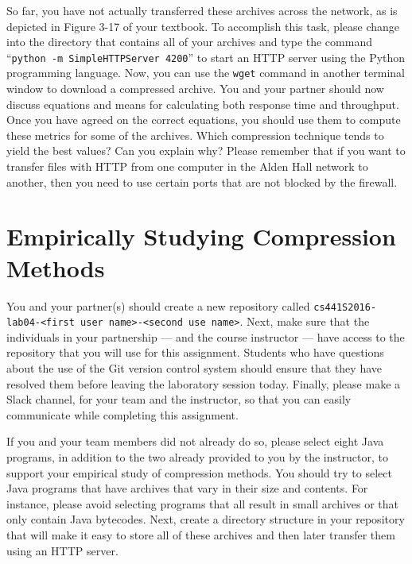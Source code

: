 So far, you have not actually transferred these archives across the network, as is depicted in Figure 3-17 of your
textbook. To accomplish this task, please change into the directory that contains all of your archives and type the
command ``{\tt python -m SimpleHTTPServer 4200}'' to start an HTTP server using the Python programming language. Now,
you can use the {\tt wget} command in another terminal window to download a compressed archive. You and your partner
should now discuss equations and means for calculating both response time and throughput. Once you have agreed on the
correct equations, you should use them to compute these metrics for some of the archives. Which compression technique
tends to yield the best values? Can you explain why? Please remember that if you want to transfer files with HTTP from
one computer in the Alden Hall network to another, then you need to use certain ports that are not blocked by the
firewall.

\section*{Empirically Studying Compression Methods}

You and your partner(s) should create a new repository called {\tt cs441S2016-lab04-<first user name>-<second use
name>}.  Next, make sure that the individuals in your partnership --- and the course instructor --- have access to the
repository that you will use for this assignment.  Students who have questions about the use of the Git version control
system should ensure that they have resolved them before leaving the laboratory session today. Finally, please make a
Slack channel, for your team and the instructor, so that you can easily communicate while completing this assignment.

If you and your team members did not already do so, please select eight Java programs, in addition to the two already
provided to you by the instructor, to support your empirical study of compression methods. You should try to select
Java programs that have archives that vary in their size and contents. For instance, please avoid selecting programs
that all result in small archives or that only contain Java bytecodes. Next, create a directory structure in your
repository that will make it easy to store all of these archives and then later transfer them using an HTTP server.

